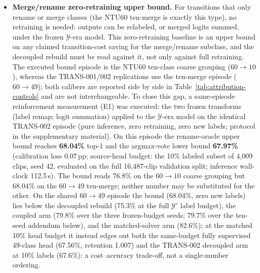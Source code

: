 \begin{itemize}
($+2.9$/$+1.4$/$-0.5$\,pp NTU120/UCF101/PanAf500), so freezing alone is nearly sufficient on the strong-reference tiers but insufficient on the weak one. No end-to-end fine-tuning arm exists on the real tiers, so the frozen-versus-full-fine-tuning contrast remains synthetic-tier evidence. A protocol-return amendment (2026-11-17/18) additionally executed the pre-registered label-free pretext on the NTU120, UCF101, and PanAf500 calibers: NTU120 reference 58.37\% (vs.\ 54.34\% interim), semantic pipeline 43.75\% $\pm$ 1.16 vs.\ 44.18\% linear ($-0.4$\,pp margin), retention 74.96\% (\textbf{FAILS}); UCF101 reference 19.87\% (vs.\ 23.11\% interim), pipeline 10.15\% $\pm$ 2.04 vs.\ 9.94\% linear ($+0.2$\,pp), retention 51.09\% (\textbf{FAILS}); PanAf500 reference 64.0\% (vs.\ 60.0\% interim), pipeline 52.8\% $\pm$ 9.6 vs.\ 60.0\% linear ($-7.2$\,pp), retention 82.5\% (\textbf{FAILS}); the interim MLP's full-label cross-entropy training is disclosed in the E9b paragraph.
\item \textbf{Merge/rename zero-retraining upper bound.} For transitions that only rename or merge classes (the NTU60 ten-merge is exactly this type), no retraining is needed: outputs can be relabeled, or merged logits summed, under the frozen $\mathcal{Y}$-era model. This zero-retraining baseline is an upper bound on any claimed transition-cost saving for the merge/rename subclass, and the decoupled rebuild must be read against it, not only against full retraining. The executed bound episode is the NTU60 ten-class coarse grouping ($60\to10$), whereas the TRANS-001/002 replications use the ten-merge episode ($60\to49$); both calibers are reported side by side in Table~\ref{tab:attribution-controls} and are not interchangeable. To close this gap, a same-episode reinforcement measurement (E1) was executed: the two frozen transforms (label remap; logit summation) applied to the $\mathcal{Y}$-era model on the identical TRANS-002 episode (pure inference, zero retraining, zero new labels; protocol in the supplementary material). On this episode the rename-oracle upper bound reaches \textbf{68.04\%} top-1 and the argmax-vote lower bound \textbf{67.97\%} (calibration loss 0.07\,pp; source-head budget: the 10\% labeled subset of 4{,}009 clips, seed 42, evaluated on the full 16{,}487-clip validation split; inference wall-clock 112.5\,s). The bound reads 76.8\% on the $60\to10$ coarse grouping but 68.04\% on the $60\to49$ ten-merge; neither number may be substituted for the other. On the shared $60\to49$ episode the bound (68.04\%, zero new labels) lies below the decoupled rebuild (75.3\% at the full $\mathcal{Y}'$ label budget), the coupled arm (79.8\% over the three frozen-budget seeds; 79.7\% over the ten-seed addendum below), and the matched-solver arm (82.6\%); at the matched 10\% head budget it instead edges out both the same-budget fully supervised 49-class head (67.56\%, retention 1.007) and the TRANS-002 decoupled arm at 10\% labels (67.6\%): a cost--accuracy trade-off, not a single-number ordering.
\end{itemize}

